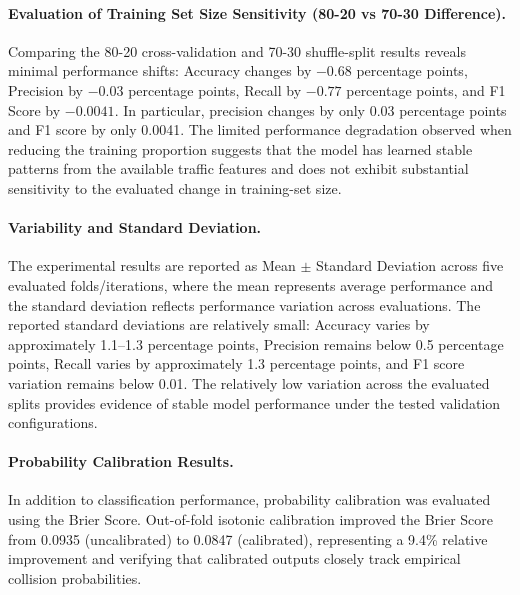 \paragraph{Evaluation of Training Set Size Sensitivity (80-20 vs 70-30 Difference).}
Comparing the 80-20 cross-validation and 70-30 shuffle-split results reveals minimal performance shifts: Accuracy changes by $-0.68$ percentage points, Precision by $-0.03$ percentage points, Recall by $-0.77$ percentage points, and F1 Score by $-0.0041$. In particular, precision changes by only 0.03 percentage points and F1 score by only 0.0041. The limited performance degradation observed when reducing the training proportion suggests that the model has learned stable patterns from the available traffic features and does not exhibit substantial sensitivity to the evaluated change in training-set size.

\paragraph{Variability and Standard Deviation.}
The experimental results are reported as Mean $\pm$ Standard Deviation across five evaluated folds/iterations, where the mean represents average performance and the standard deviation reflects performance variation across evaluations. The reported standard deviations are relatively small: Accuracy varies by approximately 1.1--1.3 percentage points, Precision remains below 0.5 percentage points, Recall varies by approximately 1.3 percentage points, and F1 score variation remains below 0.01. The relatively low variation across the evaluated splits provides evidence of stable model performance under the tested validation configurations.

\paragraph{Probability Calibration Results.}
In addition to classification performance, probability calibration was evaluated using the Brier Score. Out-of-fold isotonic calibration improved the Brier Score from 0.0935 (uncalibrated) to 0.0847 (calibrated), representing a 9.4\% relative improvement and verifying that calibrated outputs closely track empirical collision probabilities.